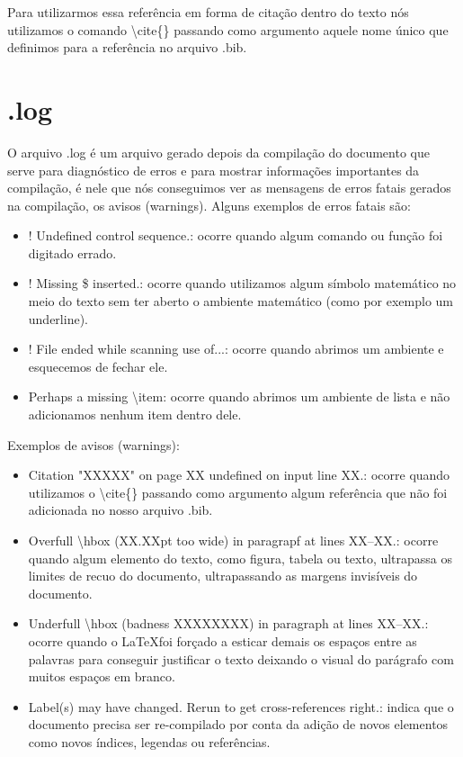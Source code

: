 Para utilizarmos essa referência em forma de citação dentro do texto nós utilizamos o comando \textbackslash cite\{\} passando como argumento aquele nome único que definimos para a referência no arquivo .bib.

\section{.log}
O arquivo .log é um arquivo gerado depois da compilação do documento que serve para diagnóstico de erros e para mostrar informações importantes da compilação, é nele que nós conseguimos ver as mensagens de erros fatais gerados na compilação, os avisos (warnings). Alguns exemplos de erros fatais são:

\begin{itemize}
    \item ! Undefined control sequence.: ocorre quando algum comando ou função foi digitado errado.
    \item ! Missing \$ inserted.: ocorre quando utilizamos algum símbolo matemático no meio do texto sem ter aberto o ambiente matemático (como por exemplo um underline).
    \item ! File ended while scanning use of...: ocorre quando abrimos um ambiente  e esquecemos de fechar ele.
    \item Perhaps a missing \textbackslash item: ocorre quando abrimos um ambiente de lista e não adicionamos nenhum item dentro dele.
\end{itemize}

Exemplos de avisos (warnings):

\begin{itemize}
    \item Citation "XXXXX" on page XX undefined on input line XX.: ocorre quando utilizamos o \textbackslash cite\{\} passando como argumento algum referência que não foi adicionada no nosso arquivo .bib.
    \item Overfull \textbackslash hbox (XX.XXpt too wide) in paragrapf at lines XX--XX.: ocorre quando algum elemento do texto, como figura, tabela ou texto, ultrapassa os limites de recuo do documento, ultrapassando as margens invisíveis do documento.
    \item Underfull \textbackslash hbox (badness XXXXXXXX) in paragraph at lines XX--XX.: ocorre quando o \LaTeX foi forçado a esticar demais os espaços entre as palavras para conseguir justificar o texto deixando o visual do parágrafo com muitos espaços em branco.
    \item Label(s) may have changed. Rerun to get cross-references right.: indica que o documento precisa ser re-compilado por conta da adição de novos elementos como novos índices, legendas ou referências.
\end{itemize}

